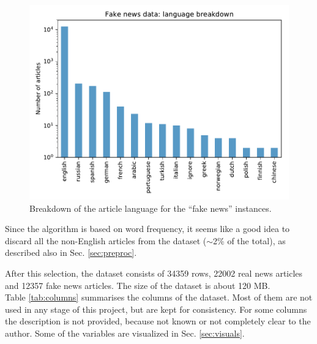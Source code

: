 \documentclass[a4paper,12pt]{article} %
\begin{document}
\begin{figure}[h!]
\caption{Breakdown of the article language for the ``fake news'' instances. \label{fig:fake_languages}}
\begin{center}
\includegraphics[scale=0.8]{plots/fake_languages}
\end{center}
\end{figure}

Since the algorithm is based on word frequency, it seems like a good idea
to discard all the non-English articles from the dataset ($\sim$2\% of the total),
as described also in Sec. \ref{sec:preproc}.

After this selection, the dataset consists of 34359 rows, 22002 real news articles and 12357 fake news articles.
The size of the dataset is about 120 MB. \\
Table \ref{tab:columns} summarises the columns of the dataset.
Most of them are not used in any stage of this project, but are kept for consistency.
For some columns the description is not provided,
because not known or not completely clear to the author.
Some of the variables are visualized in Sec. \ref{sec:visuals}.
\end{document}
